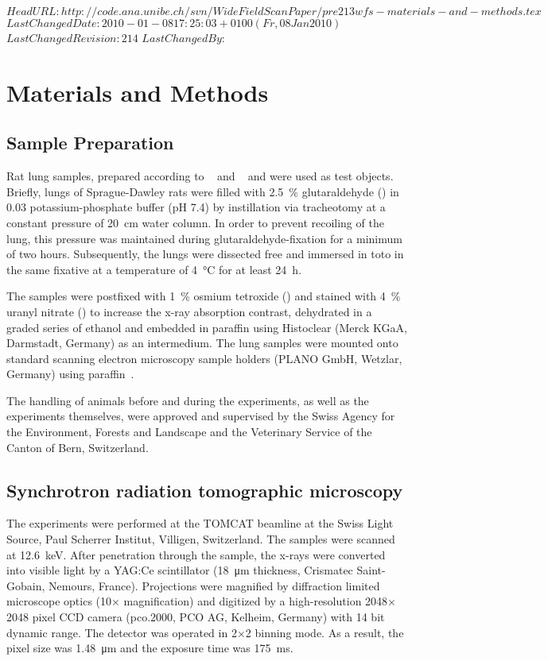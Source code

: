 \svnidlong
{$HeadURL: http://code.ana.unibe.ch/svn/WideFieldScanPaper/pre213wfs-materials-and-methods.tex $}
{$LastChangedDate: 2010-01-08 17:25:03 +0100 (Fr, 08 Jan 2010) $}
{$LastChangedRevision: 214 $}
{$LastChangedBy: $}
%
\section{Materials and Methods}\label{sec:materials and methods}
\subsection{Sample Preparation}
Rat lung samples, prepared according to%
\ifhtml
	~\citet{Tschanz2002} and \citet{Luyet2002}
\else
	~ and 
\fi%
were used as test objects. Briefly, lungs of Sprague-Dawley rats were filled with \SI{2.5}{\percent} glutaraldehyde () in \SI{0.03}{\Molar} potassium-phosphate buffer (pH 7.4) by instillation via tracheotomy at a constant pressure of \SI{20}{\centi\meter} water column. In order to prevent recoiling of the lung, this pressure was maintained during glutaraldehyde-fixation for a minimum of two hours. Subsequently, the lungs were dissected free and immersed in toto in the same fixative at a temperature of \SI{4}{\celsius} for at least \SI{24}{\hour}.

The samples were postfixed with \SI{1}{\percent} osmium tetroxide () and stained with \SI{4}{\percent} uranyl nitrate () to increase the x-ray absorption contrast, dehydrated in a graded series of ethanol and embedded in paraffin using Histoclear (Merck KGaA, Darmstadt, Germany) as an intermedium. The lung samples were mounted onto standard scanning electron microscopy sample holders (PLANO GmbH, Wetzlar, Germany) using paraffin~\cite{Tsuda2008}.

The handling of animals before and during the experiments, as well as the experiments themselves, were approved and supervised by the Swiss Agency for the Environment, Forests and Landscape and the Veterinary Service of the Canton of Bern, Switzerland.

\subsection{Synchrotron radiation tomographic microscopy}
The experiments were performed at the TOMCAT beamline at the Swiss Light Source, Paul Scherrer Institut, Villigen, Switzerland. The samples were scanned at \SI{12.6}{\kilo\electronvolt}. After penetration through the sample, the x-rays were converted into visible light by a YAG:Ce scintillator (\SI{18}{\micro\meter} thickness, Crismatec Saint-Gobain, Nemours, France). Projections were magnified by diffraction limited microscope optics (10$\times$ magnification) and digitized by a high-resolution 2048$\times$2048 pixel CCD camera (pco.2000, PCO AG, Kelheim, Germany) with 14 bit dynamic range. The detector was operated in 2$\times$2 binning mode. As a result, the pixel size was \SI{1.48}{\micro\meter} and the exposure time was \SI{175}{\milli\second}.

